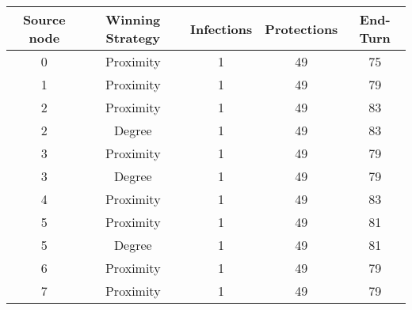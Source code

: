 \documentclass[results.tex]{subfiles}
\begin{document}
    \begin{center}
        \begin{tabular}{| c || c | c | c | c |}
            \hline
            {\bfseries Source node} & {\bfseries Winning Strategy} & {\bfseries Infections} & {\bfseries Protections}
            & {\bfseries End-Turn}
            \\  %
            \hline\hline
            0                       & Proximity                    & 1                      & 49                      & 75                   \\
            \hline
            1                       & Proximity                    & 1                      & 49                      & 79                   \\
            \hline
            2                       & Proximity                    & 1                      & 49                      & 83                   \\
            \hline
            2                       & Degree                       & 1                      & 49                      & 83                   \\
            \hline
            3                       & Proximity                    & 1                      & 49                      & 79                   \\
            \hline
            3                       & Degree                       & 1                      & 49                      & 79                   \\
            \hline
            4                       & Proximity                    & 1                      & 49                      & 83                   \\
            \hline
            5                       & Proximity                    & 1                      & 49                      & 81                   \\
            \hline
            5                       & Degree                       & 1                      & 49                      & 81                   \\
            \hline
            6                       & Proximity                    & 1                      & 49                      & 79                   \\
            \hline
            7                       & Proximity                    & 1                      & 49                      & 79                   \\

\end{tabular}
\end{center}
\end{document}
